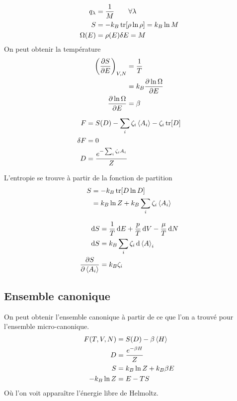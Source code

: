 \begin{align}
    q_\lambda&=\frac1M\qquad\forall\lambda\\
    S&=-k_B\trace[\rho\ln\rho]=k_B\ln M\\
    \Omega(E)&=\rho(E)\delta E=M
\end{align}
On peut obtenir la température
\begin{align}
    \qty(\pdv{S}{E})_{V,N}&=\frac1T\\
                          &=k_B\pdv{\ln\Omega}{E}\\
    \pdv{\ln\Omega}{E}&=\beta
\end{align}



\begin{align}
    F&=S(D)-\sum_i\zeta_i\expval{A_i}-\zeta_i\trace[D]\\
    \delta F&=0\\
    D&=\frac{e^{-\sum_i\zeta_iA_i}}{Z}
\end{align}

L'entropie se trouve à partir de la fonction de partition
\begin{align}
    S&=-k_B\trace[D\ln D]\\
     &=k_B\ln Z+k_B\sum_i\zeta_i\expval{A_i}
\end{align}

\begin{align}
    \dd{S}&=\frac1T\dd{E}+\frac pT\dd{V}-\frac\mu T\dd{N}\\
    \dd{S}&=k_B\sum_i\zeta_i\dd{\expval{A}_i}\\
    \pdv{S}{\expval{A_i}}&=k_B\zeta_i
\end{align}

\subsection{Ensemble canonique}

On peut obtenir l'ensemble canonique à partir de ce que l'on a trouvé pour
l'ensemble micro-canonique.
\begin{align}
    F(T,V,N)&=S(D)-\beta\expval{H}\\
    D&=\frac{e^{-\beta H}}{Z}\\
    S&=k_B\ln Z +k_B\beta E\\
    -k_B\ln Z&=E-TS
\end{align}
Où l'on voit apparaître l'énergie libre de Helmoltz.

